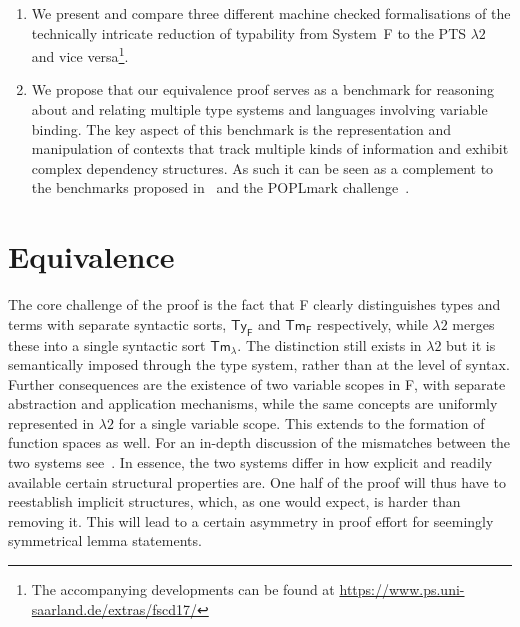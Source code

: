 \documentclass[a4paper,UKenglish]{lipics-v2016}
\newcommand{\SysL}{$\lambda2$\xspace}
\newcommand{\TyF}{\ensuremath{\mathsf{Ty_{F}}}}
\newcommand{\TmF}{\ensuremath{\mathsf{Tm_{F}}}}
\newcommand{\TmL}{\ensuremath{\mathsf{Tm_{\lambda}}}}
\theoremstyle{plain}
\begin{document}
\begin{enumerate}
\item We present and compare three different machine checked formalisations of the technically intricate reduction of typability from System~F to the PTS \SysL and vice versa\footnote{The accompanying developments can be found at \url{https://www.ps.uni-saarland.de/extras/fscd17/}}.
\item We propose that our equivalence proof serves as a benchmark for reasoning about and relating multiple type systems and languages involving variable binding.
  The key aspect of this benchmark is the representation and manipulation of contexts that track multiple kinds of information and exhibit complex dependency structures.
  As such it can be seen as a complement to the benchmarks proposed in~\cite{Felty:ITP10,Felty:orbi-survey} and the POPLmark challenge~\cite{poplmark}.
\end{enumerate}

\section{Equivalence}
\label{sec:equi}

The core challenge of the proof is the fact that F clearly distinguishes types and terms with separate syntactic sorts, $\TyF$ and $\TmF$ respectively, while \SysL merges these into a single syntactic sort $\TmL$.
The distinction still exists in \SysL but it is semantically imposed through the type system, rather than at the level of syntax.
Further consequences are the existence of two variable scopes in F, with separate abstraction and application mechanisms, while the same concepts are uniformly represented in \SysL for a single variable scope.
This extends to the formation of function spaces as well.
For an in-depth discussion of the mismatches between the two systems see~\cite{KaiserEtAl:2017:sysf_pts_equiv_coq}.
In essence, the two systems differ in how explicit and readily available certain structural properties are.
One half of the proof will thus have to reestablish implicit structures, which, as one would expect, is harder than removing it.
This will lead to a certain asymmetry in proof effort for seemingly symmetrical lemma statements.

\end{document}
